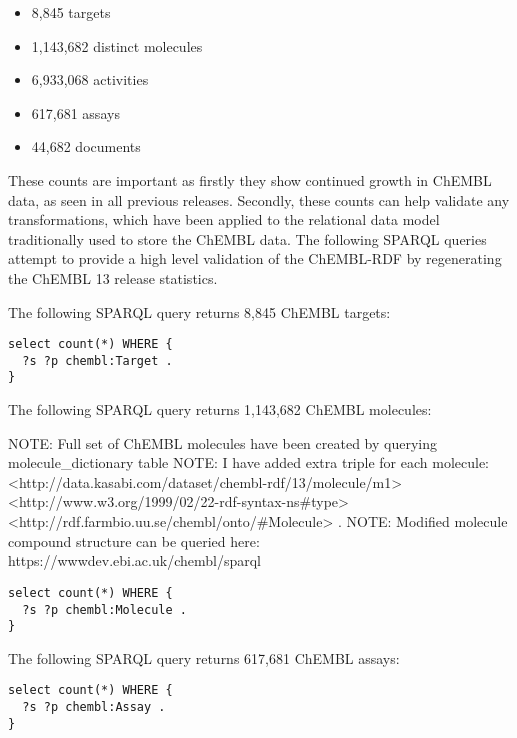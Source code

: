 \documentclass[sw]{iosart2c}
\begin{document}
\begin{itemize}
  \item 8,845 targets
  \item 1,143,682 distinct molecules
  \item 6,933,068 activities
  \item 617,681 assays
  \item 44,682 documents
\end{itemize}

These counts are important as firstly they show continued growth in ChEMBL data, as seen 
in all previous releases. Secondly, these counts can help validate any transformations, 
which have been applied to the relational data model traditionally used to store the ChEMBL 
data. The following SPARQL queries attempt to provide a high level validation of the 
ChEMBL-RDF by regenerating the ChEMBL 13 release statistics.

The following SPARQL query returns 8,845 ChEMBL targets:
     
\begin{tiny}
\begin{verbatim}
select count(*) WHERE {
  ?s ?p chembl:Target .
}
\end{verbatim}
\end{tiny}

The following SPARQL query returns 1,143,682 ChEMBL molecules:

NOTE: Full set of ChEMBL molecules have been created by querying molecule_dictionary table
NOTE: I have added extra triple for each molecule: <http://data.kasabi.com/dataset/chembl-rdf/13/molecule/m1> <http://www.w3.org/1999/02/22-rdf-syntax-ns#type> <http://rdf.farmbio.uu.se/chembl/onto/#Molecule> .
NOTE: Modified molecule compound structure can be queried here: https://wwwdev.ebi.ac.uk/chembl/sparql

\begin{tiny}
\begin{verbatim}
select count(*) WHERE {
  ?s ?p chembl:Molecule .
}
\end{verbatim}
\end{tiny}

The following SPARQL query returns 617,681 ChEMBL assays:

\begin{tiny}
\begin{verbatim}
select count(*) WHERE {
  ?s ?p chembl:Assay .
}
\end{verbatim}
\end{tiny}
\end{document}
